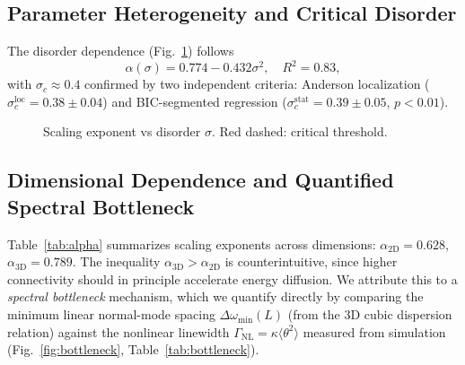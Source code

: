 \documentclass[aps,pre,12pt]{revtex4-2}
\begin{document}
\subsection{Parameter Heterogeneity and Critical Disorder}

The disorder dependence (Fig.~\ref{fig:disorder}) follows
\begin{equation}
    \alpha(\sigma)=0.774-0.432\sigma^2,\quad R^2=0.83,
\end{equation}
with $\sigma_c\approx0.4$ confirmed by two independent criteria: Anderson localization ($\sigma_c^{\text{loc}}=0.38\pm0.04$) and BIC-segmented regression ($\sigma_c^{\text{stat}}=0.39\pm0.05$, $p<0.01$).

\begin{figure}[htbp]
\centering
{}
\caption{Scaling exponent vs disorder $\sigma$. Red dashed: critical threshold.}
\label{fig:disorder}
\end{figure}

\subsection{Dimensional Dependence and Quantified Spectral Bottleneck}

Table~\ref{tab:alpha} summarizes scaling exponents across dimensions: $\alpha_{2\text{D}}=0.628$, $\alpha_{3\text{D}}=0.789$. The inequality $\alpha_{3\text{D}}>\alpha_{2\text{D}}$ is counterintuitive, since higher connectivity should in principle accelerate energy diffusion. We attribute this to a \emph{spectral bottleneck} mechanism, which we quantify directly by comparing the minimum linear normal-mode spacing $\Delta\omega_{\min}(L)$ (from the 3D cubic dispersion relation) against the nonlinear linewidth $\Gamma_{\text{NL}}=\kappa\langle\theta^2\rangle$ measured from simulation (Fig.~\ref{fig:bottleneck}, Table~\ref{tab:bottleneck}).
\end{document}
